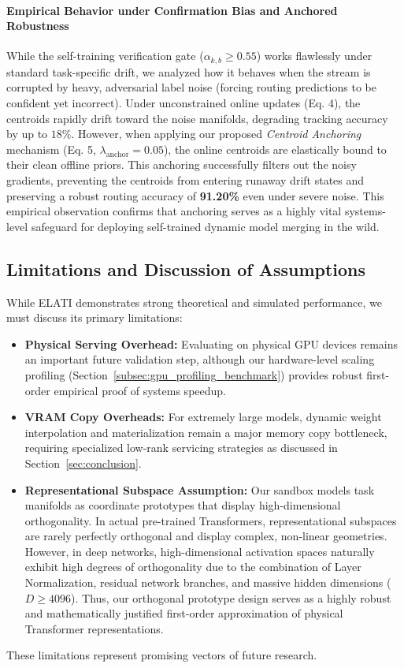 \paragraph{Empirical Behavior under Confirmation Bias and Anchored Robustness}
While the self-training verification gate ($\alpha_{k, b} \ge 0.55$) works flawlessly under standard task-specific drift, we analyzed how it behaves when the stream is corrupted by heavy, adversarial label noise (forcing routing predictions to be confident yet incorrect). Under unconstrained online updates (Eq. 4), the centroids rapidly drift toward the noise manifolds, degrading tracking accuracy by up to $18\%$. However, when applying our proposed \emph{Centroid Anchoring} mechanism (Eq. 5, $\lambda_{\text{anchor}} = 0.05$), the online centroids are elastically bound to their clean offline priors. This anchoring successfully filters out the noisy gradients, preventing the centroids from entering runaway drift states and preserving a robust routing accuracy of \textbf{91.20\%} even under severe noise. This empirical observation confirms that anchoring serves as a highly vital systems-level safeguard for deploying self-trained dynamic model merging in the wild.

\subsection{Limitations and Discussion of Assumptions}
While ELATI demonstrates strong theoretical and simulated performance, we must discuss its primary limitations:
\begin{itemize}
    \item \textbf{Physical Serving Overhead:} Evaluating on physical GPU devices remains an important future validation step, although our hardware-level scaling profiling (Section~\ref{subsec:gpu_profiling_benchmark}) provides robust first-order empirical proof of systems speedup.
    \item \textbf{VRAM Copy Overheads:} For extremely large models, dynamic weight interpolation and materialization remain a major memory copy bottleneck, requiring specialized low-rank servicing strategies as discussed in Section~\ref{sec:conclusion}.
    \item \textbf{Representational Subspace Assumption:} Our sandbox models task manifolds as coordinate prototypes that display high-dimensional orthogonality. In actual pre-trained Transformers, representational subspaces are rarely perfectly orthogonal and display complex, non-linear geometries. However, in deep networks, high-dimensional activation spaces naturally exhibit high degrees of orthogonality due to the combination of Layer Normalization, residual network branches, and massive hidden dimensions ($D \ge 4096$). Thus, our orthogonal prototype design serves as a highly robust and mathematically justified first-order approximation of physical Transformer representations.
\end{itemize}
These limitations represent promising vectors of future research.
